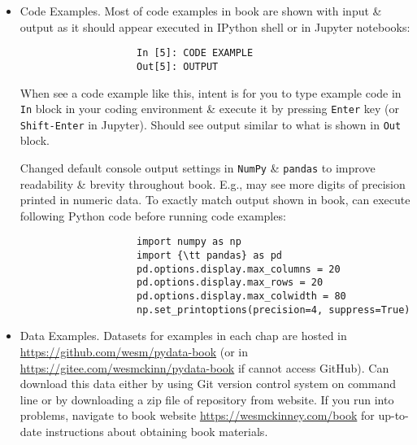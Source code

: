 \documentclass{article}
\begin{document}
\begin{enumerate}
\begin{itemize}
\begin{itemize}
			\begin{itemize}
				\item {\sf Code Examples.} Most of code examples in book are shown with input \& output as it should appear executed in IPython shell or in Jupyter notebooks:
				\begin{verbatim}
					In [5]: CODE EXAMPLE
					Out[5]: OUTPUT
				\end{verbatim}
				When see a code example like this, intent is for you to type example code in {\tt In} block in your coding environment \& execute it by pressing {\tt Enter} key (or {\tt Shift-Enter} in Jupyter). Should see output similar to what is shown in {\tt Out} block.
				
				Changed default console output settings in {\tt NumPy} \& {\tt pandas} to improve readability \& brevity throughout book. E.g., may see more digits of precision printed in numeric data. To exactly match output shown in book, can execute following Python code before running code examples:
				\begin{verbatim}
					import numpy as np
					import {\tt pandas} as pd
					pd.options.display.max_columns = 20
					pd.options.display.max_rows = 20
					pd.options.display.max_colwidth = 80
					np.set_printoptions(precision=4, suppress=True)
				\end{verbatim}
				\item {\sf Data Examples.} Datasets for examples in each chap are hosted in \url{https://github.com/wesm/pydata-book} (or in \url{https://gitee.com/wesmckinn/pydata-book} if cannot access GitHub). Can download this data either by using Git version control system on command line or by downloading a zip file of repository from website. If you run into problems, navigate to book website \url{https://wesmckinney.com/book} for up-to-date instructions about obtaining book materials.
				

\end{itemize}
\end{itemize}
\end{itemize}
\end{enumerate}
\end{document}
